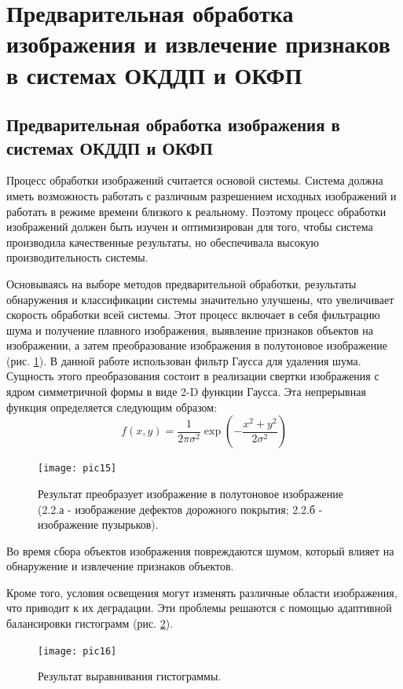 \documentclass[a4paper,14pt]{extreport}
\begin{document}
\section{Предварительная обработка изображения и извлечение признаков в системах ОКДДП и ОКФП}
\subsection{Предварительная обработка изображения в системах ОКДДП и ОКФП}
Процесс обработки изображений считается основой системы. Система должна иметь возможность работать с различным разрешением исходных изображений и работать в режиме времени близкого к реальному. Поэтому процесс обработки изображений должен быть изучен и оптимизирован для того, чтобы система производила качественные результаты, но обеспечивала высокую производительность системы.

Основываясь на выборе методов предварительной обработки, результаты обнаружения и классификации системы значительно улучшены, что увеличивает скорость обработки всей системы. Этот процесс включает в себя фильтрацию шума и получение плавного изображения, выявление признаков объектов на изображении, а затем преобразование изображения в полутоновое изображение (рис. \ref{pic15}). В данной работе использован фильтр Гаусса для удаления шума. Сущность этого преобразования состоит в реализации свертки изображения с ядром симметричной формы в виде 2-D функции Гаусса. Эта непрерывная функция определяется следующим образом:
\begin{equation}\label{eq1}
 f\left(x, y\right) = \frac{1}{2\pi\sigma^2} \exp \left(-\frac{x^2+y^2}{2\sigma^2}\right)
\end{equation}

\begin{figure}[ht!]
\centering
\texttt{[image: pic15]}
\caption{Результат преобразует изображение в полутоновое изображение (2.2.а - изображение дефектов дорожного покрытия; 2.2.б - изображение пузырьков).}
	\label{pic15}
		\end{figure}

Во время сбора объектов изображения повреждаются шумом, который влияет на обнаружение и извлечение признаков объектов.

Кроме того, условия освещения могут изменять различные области изображения, что приводит к их деградации. Эти проблемы решаются с помощью адаптивной балансировки гистограмм (рис. \ref{pic16}).
\begin{figure}[ht!]
\centering
\texttt{[image: pic16]}
\caption{Результат выравнивания гистограммы.}
	\label{pic16}
		\end{figure}
		
\end{document}
